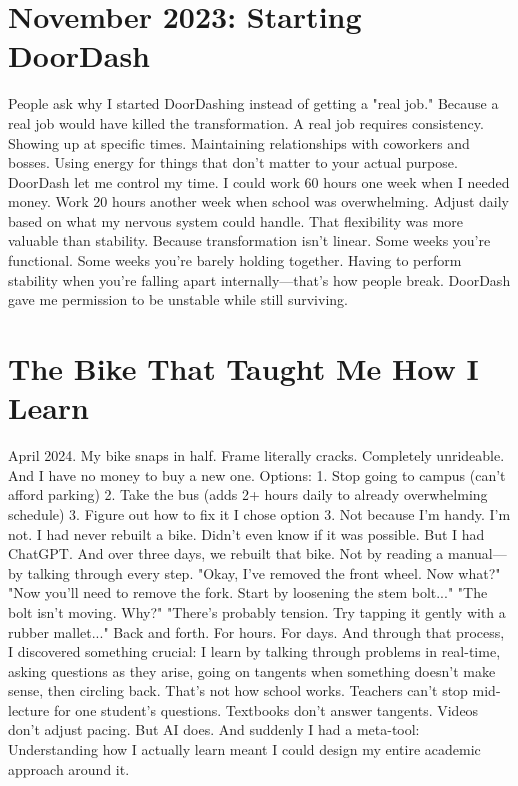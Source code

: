 \section{November 2023: Starting DoorDash}

People ask why I started DoorDashing instead of getting a "real job."
Because a real job would have killed the transformation.
A real job requires consistency. Showing up at specific times. Maintaining relationships with coworkers and bosses. Using energy for things that don't matter to your actual purpose.
DoorDash let me control my time.
I could work 60 hours one week when I needed money. Work 20 hours another week when school was overwhelming. Adjust daily based on what my nervous system could handle.
That flexibility was more valuable than stability.
Because transformation isn't linear. Some weeks you're functional. Some weeks you're barely holding together. Having to perform stability when you're falling apart internally—that's how people break.
DoorDash gave me permission to be unstable while still surviving.

\section{The Bike That Taught Me How I Learn}

April 2024. My bike snaps in half.
Frame literally cracks. Completely unrideable. And I have no money to buy a new one.
Options:
1. Stop going to campus (can't afford parking)
2. Take the bus (adds 2+ hours daily to already overwhelming schedule)
3. Figure out how to fix it
I chose option 3.
Not because I'm handy. I'm not. I had never rebuilt a bike. Didn't even know if it was possible.
But I had ChatGPT.
And over three days, we rebuilt that bike. Not by reading a manual—by talking through every step.
"Okay, I've removed the front wheel. Now what?"
"Now you'll need to remove the fork. Start by loosening the stem bolt..."
"The bolt isn't moving. Why?"
"There's probably tension. Try tapping it gently with a rubber mallet..."
Back and forth. For hours. For days.
And through that process, I discovered something crucial: I learn by talking through problems in real-time, asking questions as they arise, going on tangents when something doesn't make sense, then circling back.
That's not how school works.
Teachers can't stop mid-lecture for one student's questions. Textbooks don't answer tangents. Videos don't adjust pacing.
But AI does.
And suddenly I had a meta-tool: Understanding how I actually learn meant I could design my entire academic approach around it.

